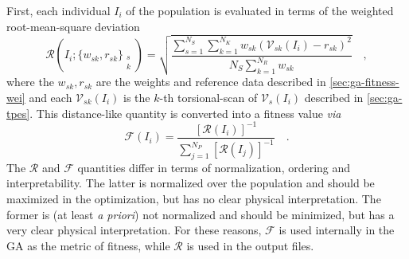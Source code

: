 \documentclass[10pt,a4paper]{report}
\numberwithin{equation}{section}
\begin{document}
First, each individual $I_i$ of the population is evaluated in terms of the weighted root-mean-square deviation
\begin{equation}
  \label{eq:ga-fitness-rmsd}
  \mathcal{R}\left(I_i;\{w_{sk},r_{sk}\}_{\substack{s\\k}} \right) = \sqrt{\frac{\sum_{s=1}^{N_S} \sum_{k=1}^{N_K} w_{sk}(\mathcal{V}_{sk}(I_i)-r_{sk})^2}{N_S \sum_{k=1}^{N_R} w_{sk}}} \quad ,
\end{equation}
where the $w_{sk},r_{sk}$ are the weights and reference data described in \autoref{sec:ga-fitness-wei}
and each $\mathcal{V}_{sk}(I_i)$ is the $k$-th torsional-scan of $\mathcal{V}_s(I_i)$ described in \autoref{sec:ga-tpes}.
This distance-like quantity is converted into a fitness value \textit{via}
\begin{equation}
  \label{eq:ga-fitness}
  \mathcal{F}(I_i) =\frac{\left[\mathcal{R}(I_i)\right]^{-1}}{\sum_{j=1}^{N_P} \left[\mathcal{R}(I_j)\right]^{-1}} \quad .
\end{equation}
The $\mathcal{R}$ and $\mathcal{F}$ quantities differ in terms of normalization, ordering and interpretability.
The latter is normalized over the population and should be maximized in the optimization, but has no clear physical interpretation.
The former is (at least \textit{a priori}) not normalized and should be minimized, but has a very clear physical interpretation.
For these reasons, $\mathcal{F}$ is used internally in the GA as the metric of fitness, while $\mathcal{R}$ is used in the output files.

\end{document}

